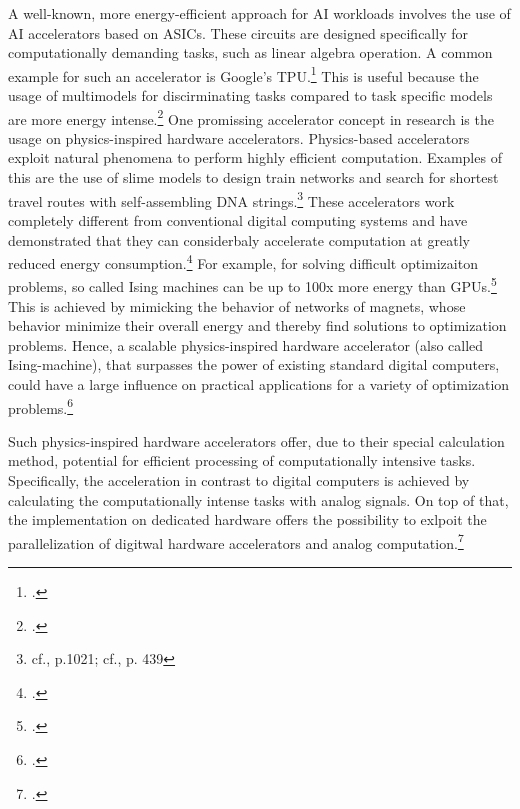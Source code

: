 A well-known, more energy-efficient approach for AI workloads involves the use of AI accelerators based on \ac{ASIC}s.
These circuits are designed specifically for computationally demanding tasks, such as linear algebra operation. A common example for such an accelerator is Google's \ac{TPU}.\footcite[cf.][39]{wittpahlKuenstlicheIntelligenzTechnologie2019} 
This is useful because the usage of multimodels for discirminating tasks compared to
task specific models are more energy intense.\footcite[cf.][5]{luccioniPowerHungryProcessing2023}
One promissing accelerator concept in research is the usage on physics-inspired hardware accelerators.
Physics-based accelerators exploit natural phenomena to perform highly efficient computation.
Examples of this are the use of slime models to design train networks and search for shortest travel routes with self-assembling DNA strings.\footnote{cf.\cite{adlemanMolecularComputationSolutions1994}, p.1021; cf.\cite{teroRulesBiologicallyInspired2010}, p. 439}
These accelerators work completely different from conventional digital computing systems and have demonstrated that they can considerbaly accelerate computation at greatly reduced energy consumption.\footcite[cf.][1]{mohseniIsingMachinesHardware2022}
For example, for solving difficult optimizaiton problems, so called Ising machines can be up to 100x more energy than \ac{GPU}s.\footcite[cf.][409-418]{caiPowerefficientCombinatorialOptimization2020}
This is achieved by mimicking the behavior of networks of magnets, whose behavior minimize their overall energy and thereby find solutions to optimization problems.
Hence, a scalable physics-inspired hardware accelerator (also called Ising-machine),
that surpasses the power of existing standard digital computers, could have a large influence
on practical applications for a variety of optimization problems.\footcite[cf.][1]{mohseniIsingMachinesHardware2022}

Such physics-inspired hardware accelerators offer, due to their special calculation method,
potential for efficient processing of computationally intensive tasks. 
Specifically, the acceleration in contrast to digital computers is achieved by calculating
the computationally intense tasks with analog signals.
On top of that, the implementation on dedicated hardware offers the possibility to exlpoit the parallelization
of digitwal hardware accelerators and analog computation.\footcite[cf.][4]{mohseniIsingMachinesHardware2022}

